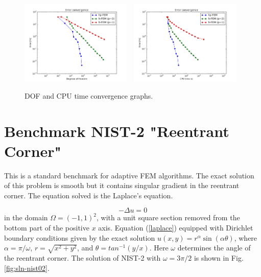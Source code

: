 \documentclass[12pt]{elsarticle}
\begin{document}
\begin{figure}[H]
\centering
\vspace{-3mm}
\includegraphics[height=4cm]{nist/nist-1/conv_dof_aniso.png}\ \
\includegraphics[height=4cm]{nist/nist-1/conv_cpu_aniso.png}
\vspace{-3mm}
\caption{DOF and CPU time convergence graphs.}
\vspace{-5mm}
\label{fig:nist-1-conv}
\end{figure}


\section{Benchmark NIST-2 "Reentrant Corner"}
\label{sec:bench-2}

This is a standard benchmark for adaptive FEM algorithms.
The exact solution of this problem is smooth but it contains
singular gradient in the reentrant corner.
The equation solved is the Laplace's equation.

\begin{equation} \label{laplace}
-\Delta u = 0
\end{equation}
in the domain $\Omega = (-1, 1)^2$, with a unit square
section removed from the bottom part of the positive $x$ axis.
Equation (\ref{laplace}) equipped with Dirichlet
boundary conditions given by the exact solution
$u(x, y) = r^{\alpha}\sin(\alpha \theta)$,
where $\alpha = \pi / \omega$, $r = \sqrt{x^2+y^2}$,
and $\theta = tan^{-1}(y/x)$. Here $\omega $ determines
the angle of the reentrant corner.
The solution of NIST-2 with $\omega = 3 \pi / 2$
is shown in Fig. \ref{fig:sln-nist02}.
\end{document}
